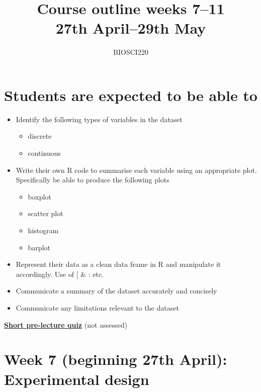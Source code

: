 \documentclass{article}
\begin{document}
\title{Course outline weeks 7--11\\ 27th April--29th May}
\author{BIOSCI220}
\date{}
\maketitle


\section*{Students are expected to be able to}
\begin{itemize}
\item Identify the following types of variables in the dataset
  \begin{itemize}
  \item discrete
  \item continuous
  \end{itemize}
\item Write their own R code to summarise each variable using an appropriate plot. Specifically be able to produce the following plots
  \begin{itemize}
  \item boxplot
  \item scatter plot
  \item histogram
  \item barplot
  \end{itemize}
\item Represent their data as a clean data frame in R and manipulate it accordingly. Use of [ \& : etc.
\item Communicate a summary of the dataset accurately and concisely
\item Communicate any limitations relevant to the dataset
\end{itemize}

\begin{center}
  \href{https://docs.google.com/forms/d/e/1FAIpQLSfQgNKk9yBFPOwhL2zv7xttnYsuw1f-FiMaP7SSUYzM7LzTJw/viewform?usp=sf_link}{\textbf{\Large Short pre-lecture quiz}} (not assessed)
  
\end{center}


\newpage


\section*{Week 7 (beginning 27th April):  Experimental design}
\end{document}
